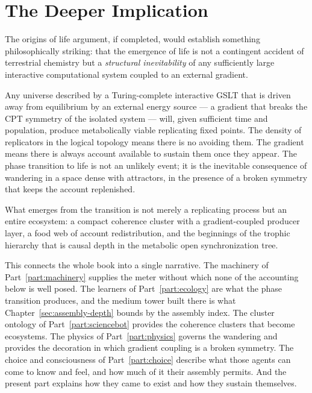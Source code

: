 \section{The Deeper Implication}

The origins of life argument, if completed, would establish
something philosophically striking: that the emergence of life
is not a contingent accident of terrestrial chemistry but a
\emph{structural inevitability} of any sufficiently large
interactive computational system coupled to an external gradient.

Any universe described by a Turing-complete interactive GSLT
that is driven away from equilibrium by an external energy source
--- a gradient that breaks the CPT symmetry of the isolated
system --- will, given sufficient time and population, produce
metabolically viable replicating fixed points.
The density of replicators in the logical topology means there is
no avoiding them.
The gradient means there is always account available to sustain
them once they appear.
The phase transition to life is not an unlikely event; it is
the inevitable consequence of wandering in a space dense with
attractors, in the presence of a broken symmetry that keeps
the account replenished.

What emerges from the transition is not merely a replicating
process but an entire ecosystem: a compact coherence cluster
with a gradient-coupled producer layer, a food web of account
redistribution, and the beginnings of the trophic hierarchy
that is causal depth in the metabolic open synchronization tree.

This connects the whole book into a single narrative.
The machinery of Part~\ref{part:machinery} supplies the meter without
which none of the accounting below is well posed.
The learners of Part~\ref{part:ecology} are what the phase transition
produces, and the medium tower built there is what
Chapter~\ref{sec:assembly-depth} bounds by the assembly index.
The cluster ontology of Part~\ref{part:sciencebot} provides the
coherence clusters that become ecosystems.
The physics of Part~\ref{part:physics} governs the wandering and
provides the decoration in which gradient coupling is a broken symmetry.
The choice and consciousness of Part~\ref{part:choice} describe what
those agents can come to know and feel, and how much of it their
assembly permits.
And the present part explains how they came to exist and how they sustain
themselves.

